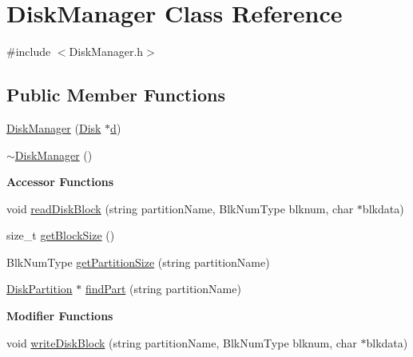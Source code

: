 \hypertarget{class_disk_manager}{}\section{Disk\+Manager Class Reference}
\label{class_disk_manager}


{\ttfamily \#include $<$Disk\+Manager.\+h$>$}

\subsection*{Public Member Functions}
\begin{DoxyCompactItemize}
\item 
\mbox{\hyperlink{class_disk_manager_a948cecec230d9895bafaced5534fd6cf}{Disk\+Manager}} (\mbox{\hyperlink{class_disk}{Disk}} $\ast$\mbox{\hyperlink{daemon_8h_a86c4a7377e8e3575bcce3c81a810d503}{d}})
\item 
\mbox{\hyperlink{class_disk_manager_a60837a3b8064649adf23e3143c85aed7}{$\sim$\+Disk\+Manager}} ()
\end{DoxyCompactItemize}
\begin{Indent}\textbf{ Accessor Functions}\par
\begin{DoxyCompactItemize}
\item 
void \mbox{\hyperlink{class_disk_manager_afda24be04fb85711236a4d5905a5ad1c}{read\+Disk\+Block}} (string partition\+Name, Blk\+Num\+Type blknum, char $\ast$blkdata)
\item 
size\+\_\+t \mbox{\hyperlink{class_disk_manager_aabdfbb2171f3c19a3ae14f9532876404}{get\+Block\+Size}} ()
\item 
Blk\+Num\+Type \mbox{\hyperlink{class_disk_manager_ae32627ccfa72013e35da637570e1729b}{get\+Partition\+Size}} (string partition\+Name)
\item 
\mbox{\hyperlink{struct_disk_partition}{Disk\+Partition}} $\ast$ \mbox{\hyperlink{class_disk_manager_a08375c254bc09c8351a4f96cb669f1ab}{find\+Part}} (string partition\+Name)
\end{DoxyCompactItemize}
\end{Indent}
\begin{Indent}\textbf{ Modifier Functions}\par
\begin{DoxyCompactItemize}
\item 
void \mbox{\hyperlink{class_disk_manager_ac96846d309a59e8ac7b100724329cb30}{write\+Disk\+Block}} (string partition\+Name, Blk\+Num\+Type blknum, char $\ast$blkdata)
\end{DoxyCompactItemize}
\end{Indent}

